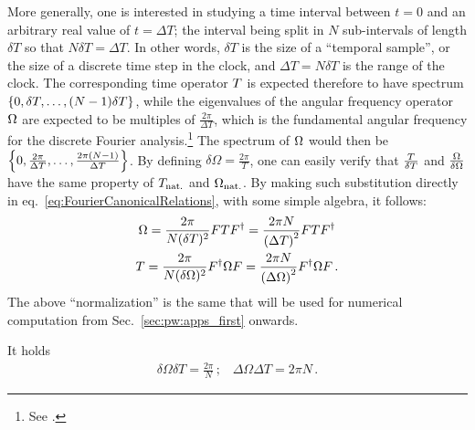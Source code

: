 More generally, one is interested in studying a time interval
between $t=0$ and an arbitrary real value of $t = \Delta{T}$;
the interval being split in $N$ sub-intervals of length $\delta{T}$
so that $N\delta{T} = \Delta{T}$.
In other words, $\delta T$
is the size of a ``temporal sample'', or the size of a discrete
time step in the clock,
and $\Delta T = N\delta T$ is the range of the clock.
The corresponding time operator ${T}$
is expected therefore to have spectrum $\left\{0, \delta{T}, \dots, (N-1)\delta{T}\right\}$,
while the eigenvalues of the angular frequency operator ${\Omega}$
are expected to be multiples of
$\frac{2\pi}{\Delta{T}}$, which is
the fundamental
angular frequency for the discrete Fourier analysis.\footnote{
  See
  \cite[chapters
    ``The Discrete Fourier Transform'' and
    ``Fourier Analysis of Signals Using the Discrete Fourier Transform'']{Oppenheim:Int1,Oppenheim:Int3}.
}
The spectrum of ${\Omega}$ would then be $\left\{0, \frac{2\pi}{\Delta{T}}, \dots, \frac{2\pi(N-1)}{\Delta{T}}\right\}$.
By defining $\delta{\Omega} = \frac{2\pi}{T}$,
one can easily verify that $\frac{{T}}{\delta{T}}$ and $\frac{{\Omega}}{\delta{\Omega}}$
have the same property of ${T}_{\mathrm{nat.}}$ and ${\Omega}_{\mathrm{nat.}}$.  
By making such substitution directly in eq.~\eqref{eq:FourierCanonicalRelations},
with some simple algebra, it follows:
\begin{gather}
  \label{eq:SI_Fourier:Omega}
    {\Omega} = \frac{2\pi}{N(\delta T)^2} F {T} F^{\dagger} = \frac{2\pi N}{\qty(\Delta T)^2} F {T} F^{\dagger} \\
  \label{eq:SI_Fourier:T}
    {T} = \frac{2\pi}{N(\delta\Omega)^2} F^{\dagger} {\Omega} F = \frac{2\pi N}{\qty(\Delta\Omega)^2} F^{\dagger} {\Omega} F
  \, \text{.}
\end{gather}
The above ``normalization'' is the same that will be used
for numerical computation from Sec.~\ref{sec:pw:apps_first} onwards.

It holds
\begin{gather}
  \delta\Omega \delta T = \frac{2\pi}{N} \, \text{;} \quad
  \Delta\Omega \Delta T = 2\pi N \, \text{.}
\end{gather}

